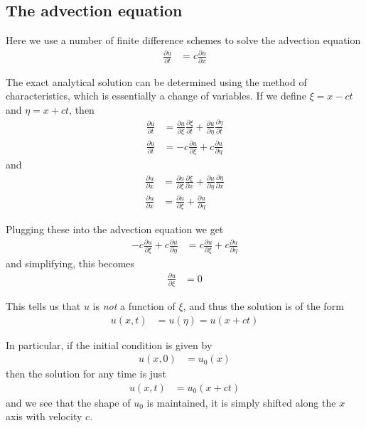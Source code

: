 \documentclass[twocolumn]{myarticle}
\begin{document}
\subsection{The advection equation}
\label{subsec:the_advection_equation}

Here we use a number of finite difference schemes to solve the advection equation
\begin{align}
    \frac{\partial u}{\partial t} &= c \frac{\partial u}{\partial x}
\end{align}

The exact analytical solution can be determined using the method of characteristics, which is essentially a change of variables.
If we define $ \xi = x - ct $ and $ \eta = x + ct $, then
\begin{align}
    \frac{\partial u}{\partial t} &= \frac{\partial u}{\partial \xi} \frac{\partial \xi}{\partial t} + \frac{\partial u}{\partial \eta} \frac{\partial \eta}{\partial t}
    \\
    \frac{\partial u}{\partial t} &= - c \frac{\partial u}{\partial \xi} + c \frac{\partial u}{\partial \eta}
\end{align}
and
\begin{align}
    \frac{\partial u}{\partial x} &= \frac{\partial u}{\partial \xi} \frac{\partial \xi}{\partial x} + \frac{\partial u}{\partial \eta} \frac{\partial \eta}{\partial x}
    \\
    \frac{\partial u}{\partial x} &= \frac{\partial u}{\partial \xi} + \frac{\partial u}{\partial \eta}
\end{align}

Plugging these into the advection equation we get
\begin{align}
    -c \frac{\partial u}{\partial \xi} + c \frac{\partial u}{\partial \eta} &= c \frac{\partial u }{\partial \xi} + c \frac{\partial u}{\partial \eta}
\end{align}
and simplifying, this becomes
\begin{align}
    \frac{\partial u}{\partial \xi} &= 0
\end{align}

This tells us that $ u $ is \emph{not} a function of $ \xi $, and thus the solution is of the form
\begin{align}
    u(x,t) &= u(\eta) = u(x + ct)
\end{align}

In particular, if the initial condition is given by
\begin{align}
    u(x,0) &= u_0(x)
\end{align}
then the solution for any time is just
\begin{align}
    u(x,t) &= u_0(x + ct)
\end{align}
and we see that the shape of $ u_0 $ is maintained, it is simply shifted along the $ x $ axis with velocity $ c $.
\end{document}
